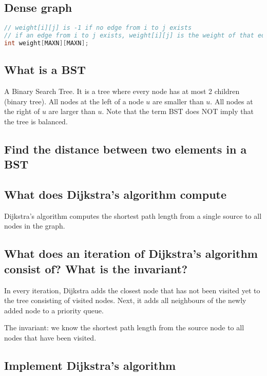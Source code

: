 \subsection{Dense graph}
\begin{lstlisting}[language=C++]
// weight[i][j] is -1 if no edge from i to j exists
// if an edge from i to j exists, weight[i][j] is the weight of that edge
int weight[MAXN][MAXN]; 
\end{lstlisting}

\subsection{What is a BST}
A Binary Search Tree. It is a tree where every node has at most 2 children (binary tree). All nodes at the left of a node $u$ are smaller than $u$. All nodes at the right of $u$ are larger than $u$.
Note that the term BST does NOT imply that the tree is balanced.

\subsection{Find the distance between two elements in a BST}



\subsection{What does Dijkstra's algorithm compute}
Dijkstra's algorithm computes the shortest path length from a single source to all nodes in the graph.

\subsection{What does an iteration of Dijkstra's algorithm consist of? What is the invariant?}
In every iteration, Dijkstra adds the closest node that has not been visited yet to the tree consisting of visited nodes. Next, it adds all neighbours of the newly added node to a priority queue.

The invariant: we know the shortest path length from the source node to all nodes that have been visited.

\subsection{Implement Dijkstra's algorithm}


